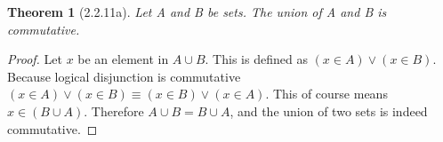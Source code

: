 \documentclass[a4paper, 12pt]{article}
\theoremstyle{plain}
\newtheorem*{theorem*}{Theorem}
\begin{document}
	
	\begin{theorem*}[2.2.11a]
		Let A and B be sets. The union of A and B is commutative.
	\end{theorem*}
	
	\begin{proof}
		Let $x$ be an element in $A \cup B$. This is defined as $(x \in A) \lor (x \in B)$. Because logical 
		disjunction is commutative \newline $(x \in A) \lor (x \in B) \equiv (x \in B) \lor (x \in A)$. This 
		of course means $x \in (B \cup A)$. Therefore $A \cup B = B \cup A$, and the union of two sets is 
		indeed commutative.
	\end{proof}
\end{document}
